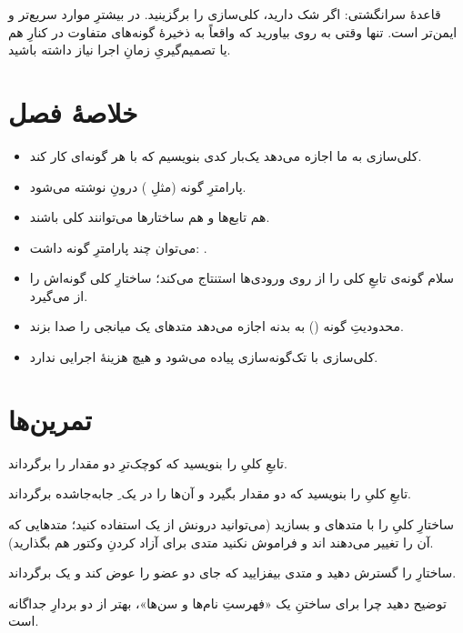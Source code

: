 \begin{tip}
قاعدهٔ سرانگشتی: اگر شک دارید، کلی‌سازی را برگزینید. در بیشترِ موارد سریع‌تر و
ایمن‌تر است. تنها وقتی به  روی بیاورید که واقعاً به ذخیرهٔ گونه‌های
متفاوت در کنارِ هم یا تصمیم‌گیریِ زمانِ اجرا نیاز داشته باشید.
\end{tip}

\section{خلاصهٔ فصل}

\begin{itemize}
  \item کلی‌سازی به ما اجازه می‌دهد یک‌بار کدی بنویسیم که با هر گونه‌ای کار کند.
  \item پارامترِ گونه (مثلِ ) درونِ \code{<\,>} نوشته می‌شود.
  \item هم تابع‌ها و هم ساختارها می‌توانند کلی باشند.
  \item می‌توان چند پارامترِ گونه داشت: .
  \item سلام گونه‌ی تابعِ کلی را از روی ورودی‌ها استنتاج می‌کند؛ ساختارِ کلی
        گونه‌اش را از  می‌گیرد.
  \item محدودیتِ گونه () به بدنه اجازه می‌دهد متدهای یک میانجی
        را صدا بزند.
  \item کلی‌سازی با تک‌گونه‌سازی پیاده می‌شود و هیچ هزینهٔ اجرایی ندارد.
\end{itemize}

\section{تمرین‌ها}

\exercise تابعِ کلیِ  را بنویسید که کوچک‌ترِ دو مقدار را
برگرداند.

\exercise تابعِ کلیِ  را بنویسید که دو مقدار بگیرد و آن‌ها را در
یک ِ جابه‌جا‌شده برگرداند.

\exercise ساختارِ کلیِ  را با متدهای  و
 بسازید (می‌توانید درونش از یک  استفاده کنید؛
متدهایی که آن را تغییر می‌دهند اند و فراموش نکنید متدی برای
آزاد کردنِ وکتور هم بگذارید).

\exercise ساختارِ  را گسترش دهید و متدی بیفزایید که جای دو عضو
را عوض کند و یک  برگرداند.

\exercise توضیح دهید چرا برای ساختنِ یک «فهرستِ نام‌ها و سن‌ها»، 
بهتر از دو بردارِ جداگانه است.
